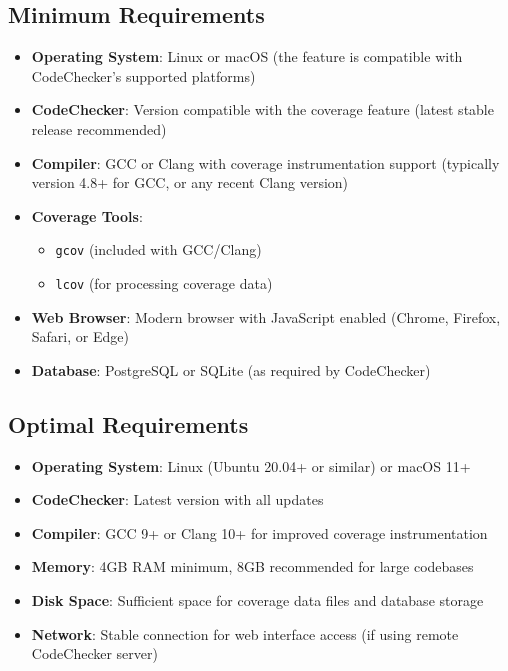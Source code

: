 \subsection{Minimum Requirements}

\begin{itemize}
    \item \textbf{Operating System}: Linux or macOS (the feature is compatible with CodeChecker's supported platforms)
    \item \textbf{CodeChecker}: Version compatible with the coverage feature (latest stable release recommended)
    \item \textbf{Compiler}: GCC or Clang with coverage instrumentation support (typically version 4.8+ for GCC, or any recent Clang version)
    \item \textbf{Coverage Tools}: 
    \begin{itemize}
        \item \texttt{gcov} (included with GCC/Clang)
        \item \texttt{lcov} (for processing coverage data)
    \end{itemize}
    \item \textbf{Web Browser}: Modern browser with JavaScript enabled (Chrome, Firefox, Safari, or Edge)
    \item \textbf{Database}: PostgreSQL or SQLite (as required by CodeChecker)
\end{itemize}

\subsection{Optimal Requirements}

\begin{itemize}
    \item \textbf{Operating System}: Linux (Ubuntu 20.04+ or similar) or macOS 11+
    \item \textbf{CodeChecker}: Latest version with all updates
    \item \textbf{Compiler}: GCC 9+ or Clang 10+ for improved coverage instrumentation
    \item \textbf{Memory}: 4GB RAM minimum, 8GB recommended for large codebases
    \item \textbf{Disk Space}: Sufficient space for coverage data files and database storage
    \item \textbf{Network}: Stable connection for web interface access (if using remote CodeChecker server)
\end{itemize}

